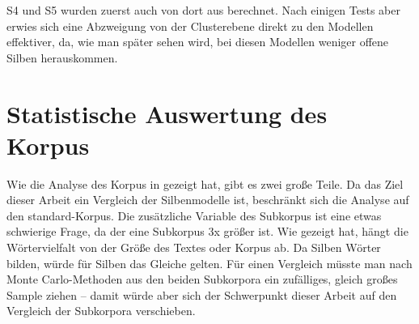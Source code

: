 \documentclass[12pt,headsepline,a4paper]{scrartcl}
\begin{document}
S4 und S5 wurden zuerst auch von dort aus berechnet. Nach einigen Tests aber erwies sich eine Abzweigung von der Clusterebene direkt zu den Modellen effektiver, da, wie man später sehen wird, bei diesen Modellen weniger offene Silben herauskommen. 

\newpage

\section{Statistische Auswertung des Korpus}
\label{sec: stat_tst}

 
Wie die Analyse des Korpus in  gezeigt hat, gibt es zwei große Teile. Da das Ziel dieser Arbeit ein Vergleich der Silbenmodelle ist, beschränkt sich die Analyse auf den standard-Korpus. Die zusätzliche Variable des Subkorpus ist eine etwas schwierige Frage, da der eine Subkorpus 3x größer ist. Wie \textcite{baayen2001} gezeigt hat, hängt die Wörtervielfalt von der Größe des Textes oder Korpus ab. Da Silben Wörter bilden, würde für Silben das Gleiche gelten. Für einen Vergleich müsste man nach Monte Carlo-Methoden aus den beiden Subkorpora ein zufälliges, gleich großes Sample ziehen -- damit würde aber sich der Schwerpunkt dieser Arbeit auf den Vergleich der Subkorpora  verschieben.
\end{document}
